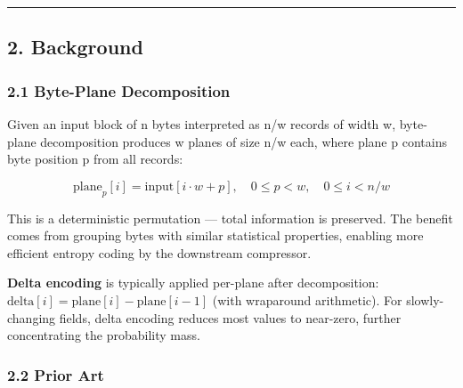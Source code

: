 \documentclass[
  11pt,
  letterpaper,
]{article}
\makeatletter
\renewcommand{\_}{\bpd@origunderscore\allowbreak}
\makeatother
\begin{document}
\begin{center}\rule{0.5\linewidth}{0.5pt}\end{center}

\hypertarget{background}{%
\subsection{2. Background}\label{background}}

\hypertarget{byte-plane-decomposition}{%
\subsubsection{2.1 Byte-Plane
Decomposition}\label{byte-plane-decomposition}}

Given an input block of n bytes interpreted as n/w records of width w,
byte-plane decomposition produces w planes of size n/w each, where plane
p contains byte position p from all records:

\[\text{plane}_p[i] = \text{input}[i \cdot w + p], \quad 0 \le p < w, \quad 0 \le i < n/w\]

This is a deterministic permutation --- total information is preserved.
The benefit comes from grouping bytes with similar statistical
properties, enabling more efficient entropy coding by the downstream
compressor.

\textbf{Delta encoding} is typically applied per-plane after
decomposition: \(\text{delta}[i] = \text{plane}[i] - \text{plane}[i-1]\)
(with wraparound arithmetic). For slowly-changing fields, delta encoding
reduces most values to near-zero, further concentrating the probability
mass.

\hypertarget{prior-art}{%
\subsubsection{2.2 Prior Art}\label{prior-art}}
\end{document}

